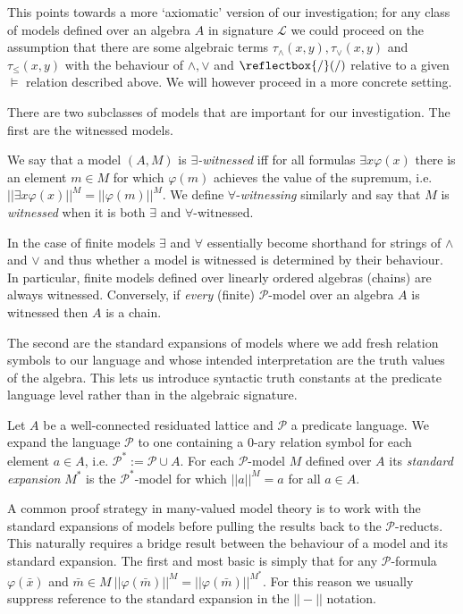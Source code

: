 \documentclass{lmcs} %
\newcommand{\?}{\ensuremath{\mkern0.4\thinmuskip}}
\newcommand{\und}{\mathord{\reflectbox{/}}}%
\let\phi=\varphi
\newcommand{\CL}{\mathcal{L}}
\newcommand{\CP}{\mathcal{P}}
\begin{document}
This points towards a more `axiomatic' version of our investigation; for any class of models defined over an algebra $A$ in signature $\CL$ we could proceed on the assumption that there are some algebraic terms $\tau_{\land}(x,y), \tau_{\lor}(x,y)$ and $\tau_{\leq}(x,y)$ with the behaviour of $\land,\lor$ and $\und (/)$ relative to a given $\models$ relation described above. We will however proceed in a more concrete setting.

There are two subclasses of models that are important for our investigation. The first are the witnessed models.
\begin{defi}
    We say that a model $(A,M)$ is $\exists$\textit{-witnessed} iff for all formulas $\exists x\phi(x)$ there is an element $m\in M$ for which $\phi(m)$ achieves the value of the supremum, i.e. $||\exists x\phi(x)||^M=||\phi(m)||^M$. We define $\forall$-\emph{witnessing} similarly and say that $M$ is \textit{witnessed} when it is both $\exists$ and $\forall$-witnessed. 
\end{defi}
\begin{rem}\label{rem:witnessedifflinear}
    In the case of finite models $\exists$ and $\forall$ essentially become shorthand for strings of $\land$ and $\lor$ and thus whether a model is witnessed is determined by their behaviour. In particular, finite models defined over linearly ordered algebras (chains) are always witnessed. Conversely, if \textit{every} (finite) $\CP$-model over an algebra $A$ is witnessed then $A$ is a chain. 
\end{rem} 

The second are the standard expansions of models where we add fresh relation symbols to our language and whose intended interpretation are the truth values of the algebra. This lets us introduce syntactic truth constants at the predicate language level rather than in the algebraic signature. 
\begin{defi}
    Let $A$ be a well-connected residuated lattice and $\CP$ a predicate language. We expand the language $\CP$ to one containing a $0$-ary relation symbol for each element $a\in A$, i.e. $\CP^\ast:=\CP\cup A$. For each $\CP$-model $M$ defined over $A$ its \textit{standard expansion} $M^\ast$ is the $\CP^\ast$-model for which $||a||^M=a$ for all $a\in A$. 
\end{defi}
\begin{rem}
    A common proof strategy in many-valued model theory is to work with the standard expansions of models before pulling the results back to the $\CP$-reducts. This naturally requires a bridge result between the behaviour of a model and its standard expansion. The first and most basic is simply that for any $\CP$-formula $\phi(\bar{x})$ and $\bar{m}\in M\ ||\phi(\bar{m})||^M=||\phi(\bar{m})||^{M^\ast}$. For this reason we usually suppress reference to the standard expansion in the $||-||$ notation.
\end{rem}
\end{document}
